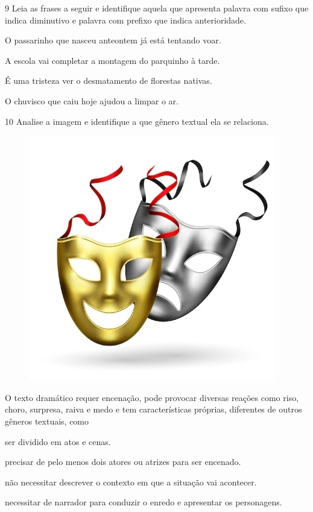 \num{9} Leia as frases a seguir e identifique aquela que apresenta palavra
com sufixo que indica diminutivo e palavra com prefixo que indica
anterioridade.

\begin{escolha}
\item O passarinho que nasceu anteontem já está tentando voar.

\item A escola vai completar a montagem do parquinho à tarde.

\item É uma tristeza ver o desmatamento de florestas nativas.

\item O chuvisco que caiu hoje ajudou a limpar o ar.
\end{escolha}


\num{10} Analise a imagem e identifique a que gênero textual ela se relaciona.

\begin{figure}[htpb!]
\centering
\includegraphics[width=.8\textwidth]{./media/simulados/image1.jpeg}
\end{figure}

O texto dramático requer encenação, pode provocar diversas reações como
riso, choro, surpresa, raiva e medo e tem características próprias,
diferentes de outros gêneros textuais, como

\begin{escolha}
\item ser dividido em atos e cenas.

\item precisar de pelo menos dois atores ou atrizes para ser encenado.

\item não necessitar descrever o contexto em que a situação vai acontecer.

\item necessitar de narrador para conduzir o enredo e apresentar os personagens.
\end{escolha}
\pagebreak

